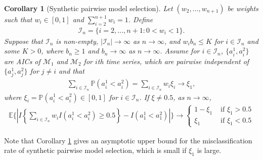 \documentclass[11pt]{article}
\def\mbf#1{\mathbf{#1}} %
\def\mc#1{\mathcal{#1}} %
\def\E{\mathbb{E}} %
\def\mc#1{\mathcal{#1}}
\def\P{\mathbb{P}}
\newtheorem{corollary}{Corollary}
\theoremstyle{definition}
\begin{document}
\begin{corollary}[Synthetic pairwise model selection]
\label{coro2}Let $(w_2, \ldots, w_{n+1})$ be weights such that $w_i \in [0,1]$ and $\sum_{i=2}^{n+1} w_i=1$. Define
\begin{align*}
  \mc{I}_n = \{i =  2,\ldots, n+1\colon 0< w_i < 1\}.
\end{align*}
Suppose that  $\mc{I}_n$  is non-empty, $|\mc{I}_n| \to \infty$ as $n \to \infty$, and $w_i b_n\leq K$ for $i\in \mc{I}_n$ and some $K>0$, where $b_n \geq 1$ and $b_n \to \infty$ as $n\to \infty$. Assume for $i \in \mc{I}_n$,  $\{a_i^1, a_i^2\}$ are AICs of $\mc{M}_1$ and  $\mc{M}_2$ for $i$th time series, which are pairwise independent of $\{a_j^1, a_j^2\}$ for $j \neq i$ and that
\begin{align*}
  \sum_{i\in \mc{I}_n}\P(a_i^1 < a_i^2) = \sum_{i\in \mc{I}_n} w_i \xi_i \to \xi_{1},
\end{align*}
where $\xi_i =  \P(a_i^1 < a_i^2)\in [0,1]$ for $i \in \mc{I}_n$. If $\xi  \neq 0.5$, as $n\to \infty$, 
\begin{align*}
  \E \bigg\{\left|I\left\{ \sum_{i\in \mc{I}_n} w_i I(a_i^1 < a_i^2) \geq 0.5\right\}
  - I( a_1^1 < a_1^2) \right|\bigg\}
  \to  \begin{cases}
    1- \xi_1 & \text{ if } \xi_1 > 0.5 \\
   \xi_1 & \text{ if } \xi_1 < 0.5 
  \end{cases}
\end{align*}
\end{corollary}

Note that Corollary \ref{coro2} gives an asymptotic upper bound for the misclassification rate of synthetic pairwise model selection, which is small if $\xi_1$ is large.



\end{document}

